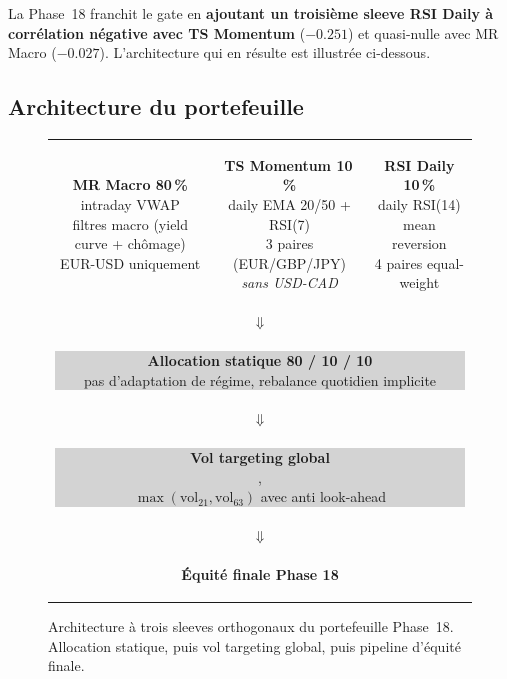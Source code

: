 La Phase~18 franchit le gate en \textbf{ajoutant un troisième sleeve RSI Daily à corrélation négative avec TS Momentum} ($-0.251$) et quasi-nulle avec MR Macro ($-0.027$). L'architecture qui en résulte est illustrée ci-dessous.

\subsection{Architecture du portefeuille}

\begin{figure}[H]
\centering
\small
\begin{tabular}{ccc}
\colorbox{softBlue}{\parbox{4.5cm}{\centering\color{primary}\sffamily\textbf{MR Macro 80\,\%}\\[0.2em]\footnotesize intraday VWAP\\filtres macro (yield curve + chômage)\\EUR-USD uniquement}} &
\colorbox{softYellow}{\parbox{4.5cm}{\centering\color{accent}\sffamily\textbf{TS Momentum 10\,\%}\\[0.2em]\footnotesize daily EMA 20/50 + RSI(7)\\3 paires (EUR/GBP/JPY)\\\textit{sans USD-CAD}}} &
\colorbox{softGreen}{\parbox{4.5cm}{\centering\color{rsiGreen}\sffamily\textbf{RSI Daily 10\,\%}\\[0.2em]\footnotesize daily RSI(14)\\mean reversion\\4 paires equal-weight}} \\[1.2em]
\multicolumn{3}{c}{$\Downarrow$} \\[0.3em]
\multicolumn{3}{c}{\colorbox{lightGrey}{\parbox{12cm}{\centering\color{primary}\sffamily\textbf{Allocation statique 80 / 10 / 10}\\[0.1em]\footnotesize pas d'adaptation de régime, rebalance quotidien implicite}}} \\[0.6em]
\multicolumn{3}{c}{$\Downarrow$} \\[0.3em]
\multicolumn{3}{c}{\colorbox{lightGrey}{\parbox{12cm}{\centering\color{primary}\sffamily\textbf{Vol targeting global}\\[0.1em]\footnotesize {}, \\$\max(\mathrm{vol}_{21}, \mathrm{vol}_{63})$ avec  anti look-ahead}}} \\[0.6em]
\multicolumn{3}{c}{$\Downarrow$} \\[0.3em]
\multicolumn{3}{c}{\colorbox{primary}{\parbox{12cm}{\centering\color{white}\sffamily\textbf{Équité finale Phase 18}}}} \\
\end{tabular}
\caption{Architecture à trois sleeves orthogonaux du portefeuille Phase~18. Allocation statique, puis vol targeting global, puis pipeline d'équité finale.}
\end{figure}

